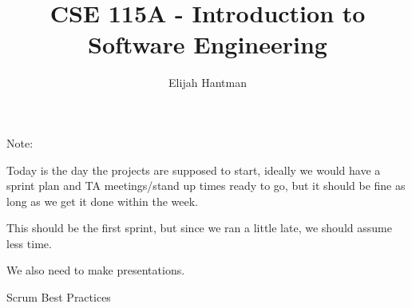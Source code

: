\documentclass{report}
\title{\Huge{CSE 115A - Introduction to Software Engineering}}
\author{\huge{Elijah Hantman}}
\date{}
\begin{document}
\maketitle
\newpage

\begin{mdframed}
    Note: 

    Today is the day the projects are supposed to start,
    ideally we would have a sprint plan and TA meetings/stand up
    times ready to go, but it should be fine as long as we get it done
    within the week.

    This should be the first sprint, but since we ran a little late, we
    should assume less time.

    We also need to make presentations.
\end{mdframed}

{\huge Scrum Best Practices}
\end{document}
